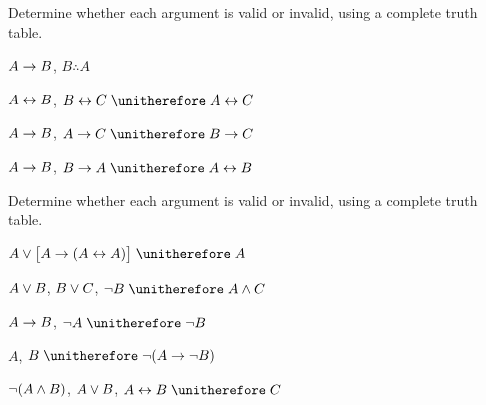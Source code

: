 \noindent\problempart
\label{pr.TT.valid2}
Determine whether each argument is valid or invalid, using a complete truth table.
\begin{compactlist}
\item $A\rightarrow B$, $B \therefore  A$ %

\item $A\leftrightarrow B$, $B\eiff C \therefore A\eiff C$ %

\item $A \rightarrow B$, $A \eif C\therefore B \eif C$ %

\item $A \rightarrow B$, $B \eif A\therefore A \eiff B$ %

\end{compactlist}

\noindent\problempart
\label{pr.TT.valid3}
Determine whether each argument is valid or invalid, using a complete truth table.
\begin{compactlist}
\item $A\eor\bigl[A\eif(A\eiff A)\bigr] \therefore  A $\vspace{.5ex}%
\item $A\vee B$, $B\vee C$, $\enot B \therefore A \eand C$\vspace{.5ex} %
\item $A \rightarrow B$, $\enot A\therefore \enot B$ \vspace{.5ex}%
\item $A$, $B\therefore \enot(A\eif \enot B)$ \vspace{.5ex}%
\item $\neg(A \wedge B)$, $A \vee B$, $A \eiff B\therefore C$ \vspace{.5ex}%
\end{compactlist}


